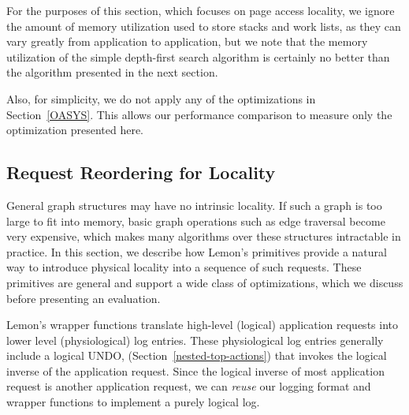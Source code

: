 \documentclass[10pt,letterpaper,twocolumn,english]{article}
\newcommand{\yad}{Lemon\xspace}
\begin{document}
For the purposes of this section, which focuses on page access
locality, we ignore the amount of memory utilization used to store
stacks and work lists, as they can vary greatly from application to
application, but we note that the memory utilization of the simple
depth-first search algorithm is certainly no better than the algorithm
presented in the next section.

Also, for simplicity, we do not apply any of the optimizations in
Section~\ref{OASYS}.  This allows our performance comparison to
 measure only the optimization presented here.

\subsection {Request Reordering for Locality}

General graph structures may have no intrinsic locality.  If such a
graph is too large to fit into memory, basic graph operations such as
edge traversal become very expensive, which makes many algorithms over
these structures intractable in practice.  In this section, we
describe how \yad's primitives provide a natural way to introduce
physical locality into a sequence of such requests.  These primitives
are general and support a wide class of optimizations, which we discuss
before presenting an evaluation.

\yad's wrapper functions translate high-level (logical) application
requests into lower level (physiological) log entries.  These
physiological log entries generally include a logical UNDO,
(Section~\ref{nested-top-actions}) that invokes the logical
inverse of the application request.  Since the logical inverse of most
application request is another application request, we can {\em reuse} our
logging format and wrapper functions to implement a purely logical log.
\end{document}

